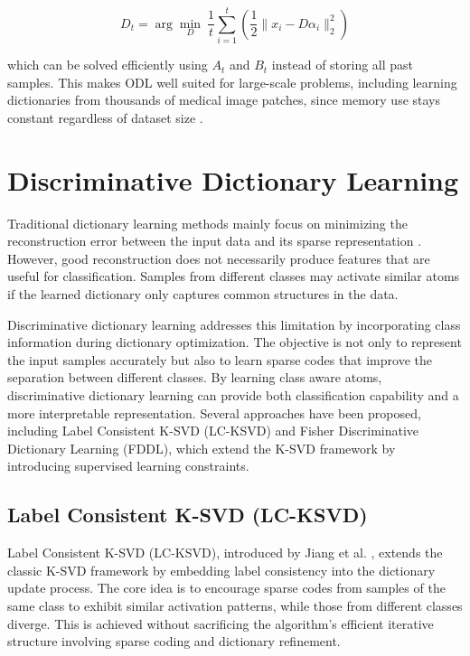 \begin{equation}[ODL Dictionary Update]
D_t = \arg\min_{D} \ \frac{1}{t}\sum_{i=1}^{t} \left( \frac{1}{2}\|x_i - D\alpha_i\|_2^2 \right)
\end{equation}

which can be solved efficiently using $A_t$ and $B_t$ instead of storing all past samples. This makes ODL well suited for large-scale problems,
including learning dictionaries from thousands of medical image patches, since memory use stays constant regardless of dataset size \cite{10.1145/1553374.1553463}.

\section{Discriminative Dictionary Learning}

Traditional dictionary learning methods mainly focus on minimizing the
reconstruction error between the input data and its sparse representation
\cite{aharon2006ksvd}. However, good reconstruction does not necessarily 
produce features that are useful for classification. Samples from different 
classes may activate similar atoms if the learned dictionary only captures 
common structures in the data.

Discriminative dictionary learning addresses this limitation by incorporating
class information during dictionary optimization. The objective is not only to
represent the input samples accurately but also to learn sparse codes that
improve the separation between different classes. By learning class aware atoms, 
discriminative dictionary learning can provide both classification capability 
and a more interpretable representation. Several approaches have been proposed, 
including Label Consistent K-SVD (LC-KSVD) and Fisher Discriminative Dictionary 
Learning (FDDL), which extend the K-SVD framework by introducing supervised 
learning constraints.

\subsection{Label Consistent K-SVD (LC-KSVD)}
\label{sec:lit-lcksvd}

Label Consistent K-SVD (LC-KSVD), introduced by Jiang et al. \cite{jiang2013lcksvd}, 
extends the classic K-SVD framework by embedding label consistency into the 
dictionary update process. The core idea is to encourage sparse codes from 
samples of the same class to exhibit similar activation patterns, while those 
from different classes diverge. This is achieved without sacrificing the 
algorithm's efficient iterative structure involving sparse coding and dictionary 
refinement.

